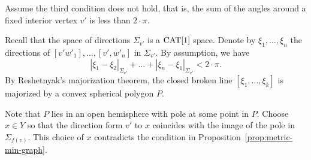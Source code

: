 Assume the third condition does not hold, that is, 
the sum of the angles around a fixed interior vertex $v'$ is less than $2\cdot\pi$.

Recall that the space of directions $\Sigma_{v'}$ is a $\mathop{\rm CAT}\nolimits[1]$ space.
Denote by $\xi_1,\dots,\xi_n$ the directions of $[v'w'_1],\dots, [v',w'_n]$ in $\Sigma_{v'}$.
By assumption, we have
\[|\xi_1-\xi_2|_{\Sigma_{v'}}+\dots+|\xi_n-\xi_1|_{\Sigma_{v'}}<2\cdot\pi.\]
By Reshetnyak's majorization theorem,
the closed broken line $[\xi_1,\dots,\xi_k]$ is majorized by a convex spherical polygon $P$.

Note that $P$ lies in an open hemisphere with pole  at some point in $P$.
Choose $x\in Y$ so that the direction form $v'$ to $x$ coincides with the image of the pole in $\Sigma_{f(v)}$.
This choice of $x$ contradicts the condition in Proposition~\ref{prop:metric-min-graph}.
\qeds